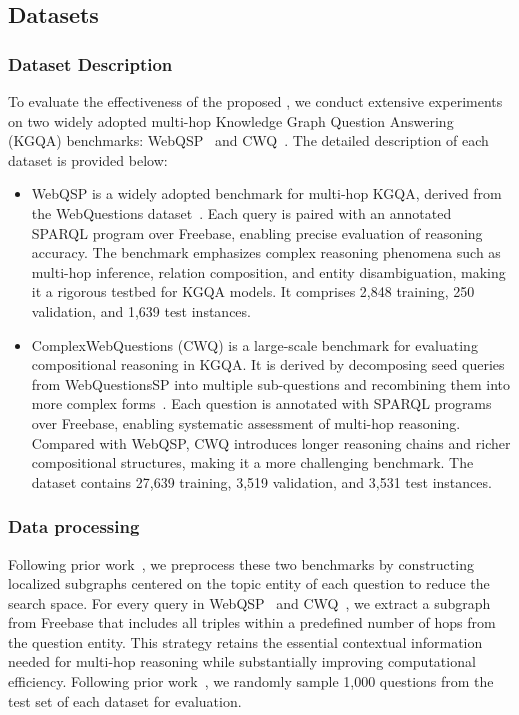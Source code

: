 \subsection{Datasets}\label{sec:dataset}



\subsubsection{Dataset Description}

To evaluate the effectiveness of the proposed \method{}, we conduct extensive experiments on two widely adopted multi-hop Knowledge Graph Question Answering (KGQA) benchmarks: WebQSP~\cite{talmor2018web} and CWQ~\cite{yih2016value}. The detailed description of each dataset is provided below:

\begin{itemize}
    \item WebQSP is a widely adopted benchmark for multi-hop KGQA, derived from the WebQuestions dataset~\cite{yih2016value}. Each query is paired with an annotated SPARQL program over Freebase, enabling precise evaluation of reasoning accuracy. The benchmark emphasizes complex reasoning phenomena such as multi-hop inference, relation composition, and entity disambiguation, making it a rigorous testbed for KGQA models. It comprises 2,848 training, 250 validation, and 1,639 test instances.
    \item ComplexWebQuestions (CWQ) is a large-scale benchmark for evaluating compositional reasoning in KGQA. It is derived by decomposing seed queries from WebQuestionsSP into multiple sub-questions and recombining them into more complex forms~\cite{talmor2018web}. Each question is annotated with SPARQL programs over Freebase, enabling systematic assessment of multi-hop reasoning. Compared with WebQSP, CWQ introduces longer reasoning chains and richer compositional structures, making it a more challenging benchmark. The dataset contains 27,639 training, 3,519 validation, and 3,531 test instances.
\end{itemize}

\subsubsection{Data processing}

Following prior work~\cite{shen2025reasoning,wang2025dynamically}, we preprocess these two benchmarks by constructing localized subgraphs centered on the topic entity of each question to reduce the search space. For every query in WebQSP~\cite{yih2016value} and CWQ~\cite{talmor2018web}, we extract a subgraph from Freebase that includes all triples within a predefined number of hops from the question entity. This strategy retains the essential contextual information needed for multi-hop reasoning while substantially improving computational efficiency. Following prior work~\cite{sun2023think,wang2025dynamically}, we randomly sample 1,000 questions from the test set of each dataset for evaluation. 

